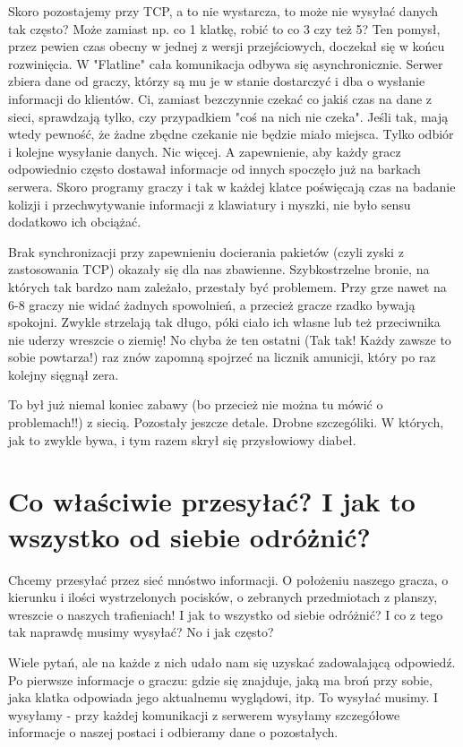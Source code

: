 \documentclass[licencjacka]{pracamgr}
\begin{document}
Skoro pozostajemy przy TCP, a to nie wystarcza, to może nie wysyłać danych tak często? Może zamiast np. co 1 klatkę, robić to co 3 czy też 5? Ten pomysł, przez pewien czas obecny w jednej z wersji przejściowych, doczekał się w końcu rozwinięcia. W "Flatline" cała komunikacja odbywa się asynchronicznie. Serwer zbiera dane od graczy, którzy są mu je w stanie dostarczyć i dba o wysłanie informacji do klientów. Ci, zamiast bezczynnie czekać co jakiś czas na dane z sieci, sprawdzają tylko, czy przypadkiem "coś na nich nie czeka". Jeśli tak, mają wtedy pewność, że żadne zbędne czekanie nie będzie miało miejsca. Tylko odbiór i kolejne wysyłanie danych. Nic więcej. A zapewnienie, aby każdy gracz odpowiednio często dostawał informacje od innych spoczęło już na barkach serwera. Skoro programy graczy i tak w każdej klatce poświęcają czas na badanie kolizji i przechwytywanie informacji z klawiatury i myszki, nie było sensu dodatkowo ich obciążać.

Brak synchronizacji przy zapewnieniu docierania pakietów (czyli zyski z zastosowania TCP) okazały się dla nas zbawienne. Szybkostrzelne bronie, na których tak bardzo nam zależało, przestały być problemem. Przy grze nawet na 6-8 graczy nie widać żadnych spowolnień, a przecież gracze rzadko bywają spokojni. Zwykle strzelają tak długo, póki ciało ich własne lub też przeciwnika nie uderzy wreszcie o ziemię! No chyba że ten ostatni (Tak tak! Każdy zawsze to sobie powtarza!) raz znów zapomną spojrzeć na licznik amunicji, który po raz kolejny sięgnął zera.

To był już niemal koniec zabawy (bo przecież nie można tu mówić o problemach!!) z siecią. Pozostały jeszcze detale. Drobne szczególiki. W których, jak to zwykle bywa, i tym razem skrył się przysłowiowy diabeł.

\section{Co właściwie przesyłać? I jak to wszystko od siebie odróżnić?}

Chcemy przesyłać przez sieć mnóstwo informacji. O położeniu naszego gracza, o kierunku i ilości wystrzelonych pocisków, o zebranych przedmiotach z planszy, wreszcie o naszych trafieniach! I jak to wszystko od siebie odróżnić? I co z tego tak naprawdę musimy wysyłać? No i jak często?

Wiele pytań, ale na każde z nich udało nam się uzyskać zadowalającą odpowiedź. Po pierwsze informacje o graczu: gdzie się znajduje, jaką ma broń przy sobie, jaka klatka odpowiada jego aktualnemu wyglądowi, itp. To wysyłać musimy. I wysyłamy - przy każdej komunikacji z serwerem wysyłamy szczegółowe informacje o naszej postaci i odbieramy dane o pozostałych.
\end{document}

